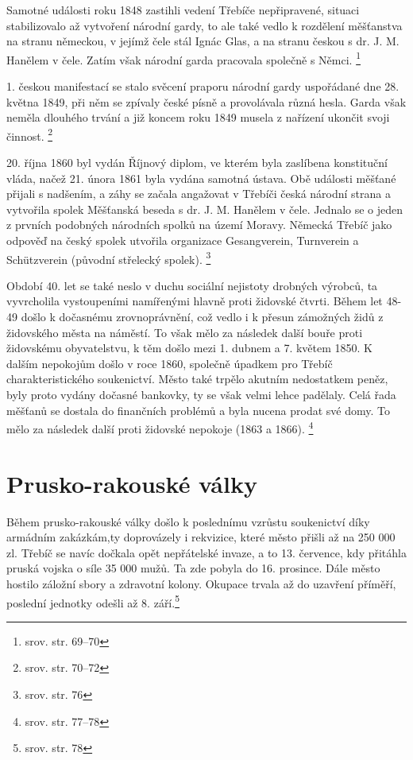 \documentclass[a4paper,oneside,12pt]{report}
\begin{document}
Samotné události roku 1848 zastihli vedení Třebíče nepřipravené, situaci stabilizovalo až vytvoření národní gardy, to ale také vedlo k rozdělení měšťanstva na stranu německou, v jejímž čele stál Ignác Glas, a na stranu českou s dr. J. M. Hanělem v čele.
Zatím však národní garda pracovala společně s Němci. \footnote{srov. \cite{Janak1981} str. 69--70}

1. českou manifestací se stalo svěcení praporu národní gardy uspořádané dne 28. května 1849, při něm se zpívaly české písně a provolávala různá hesla.
Garda však neměla dlouhého trvání a již koncem roku 1849 musela z nařízení ukončit svoji činnost. \footnote{srov. \cite{Janak1981} str. 70--72}

20. října 1860 byl vydán Říjnový diplom, ve kterém byla zaslíbena konstituční vláda, načež 21. února 1861 byla vydána samotná ústava.
Obě události měšťané přijali s nadšením, a záhy se začala angažovat v Třebíči česká národní strana a vytvořila spolek Měšťanská beseda s dr. J. M. Hanělem v čele.
Jednalo se o jeden z prvních podobných národních spolků na území Moravy.
Německá Třebíč jako odpověď na český spolek utvořila organizace Gesangverein, Turnverein a Schützverein (původní střelecký spolek). \footnote{srov. \cite{Janak1981} str. 76}

Období 40. let se také neslo v duchu sociální nejistoty drobných výrobců, ta vyvrcholila vystoupeními namířenými hlavně proti židovské čtvrti.
Během let 48-49 došlo k dočasnému zrovnoprávnění, což vedlo i k přesun zámožných židů z židovského města na náměstí.
To však mělo za následek další bouře proti židovskému obyvatelstvu, k těm došlo mezi 1. dubnem a 7. květem 1850.
K dalším nepokojům došlo v roce 1860, společně úpadkem pro Třebíč charakteristického soukenictví.
Město také trpělo akutním nedostatkem peněz, byly proto vydány dočasné bankovky, ty se však velmi lehce padělaly.
Celá řada měšťanů se dostala do finančních problémů a byla nucena prodat své domy.
To mělo za následek další proti židovské nepokoje (1863 a 1866). \footnote{srov. \cite{Janak1981} str. 77--78}

\section{Prusko-rakouské války}

Během prusko-rakouské války došlo k poslednímu vzrůstu soukenictví díky armádním zakázkám,ty doprovázely i rekvizice, které město přišli až na 250 000 zl.
Třebíč se navíc dočkala opět nepřátelské invaze, a to 13. července, kdy přitáhla pruská vojska o síle 35 000 mužů.
Ta zde pobyla do 16. prosince.
Dále město hostilo záložní sbory a zdravotní kolony.
Okupace trvala až do uzavření příměří, poslední jednotky odešli až 8. září.\footnote{srov. \cite{Janak1981} str. 78}
\end{document}
